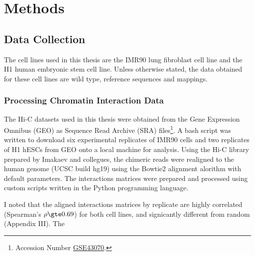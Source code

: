 \documentclass[phd,tocprelim]{cornell}
\begin{document}


\chapter{Methods}

\section{Data Collection}

The cell lines used in this thesis are the IMR90 lung fibroblast cell line and the H1 human embryonic stem
cell line.  Unless otherwise stated, the data obtained for these cell lines are wild type, reference sequences
and mappings.

\subsection{Processing Chromatin Interaction Data}

The Hi-C datasets used in this thesis were obtained from the Gene Expression Omnibus (GEO)\cite{edgar2002}
as Sequence Read Archive (SRA) files\footnote{Accession Number %
\href{http://www.ncbi.nlm.nih.gov/geo/query/acc.cgi?acc=GSE43070}{GSE43070}.}.  A bash script was written
to download six experimental replicates of IMR90 cells and two replicates of H1 hESCs from GEO onto a
local machine for analysis.  Using the Hi-C library prepared by Imakaev and collegues\cite{imakaev2012},
the chimeric reads were realigned to the human genome (UCSC build hg19) using the Bowtie2 alignment
alorithm\cite{langmead2012} with default parameters.  The interactions matrices were prepared and processed
using custom scripts written in the Python programming language.

I noted that the aligned interactions matrices by replicate are highly correlated (Spearman's $\rho \gte 0.69$)  %
for both cell lines, and signicantly different from random (Appendix III).  The

\end{document}
